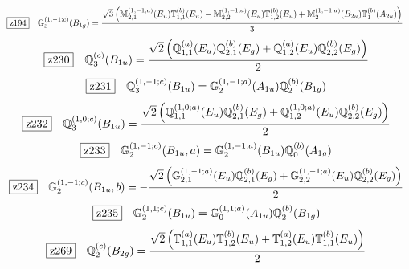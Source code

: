 \documentclass[fleqn,10pt,landscape]{jsarticle}
\begin{document}
\begin{dmath*}
\hspace*{3mm}\fbox{z194}\quad \mathbb{G}_{3}^{(1,-1;c)}(B_{1g})=\frac{\sqrt{3} \left(\mathbb{M}_{2,1}^{(1,-1;a)}(E_{u}) \mathbb{T}_{1,1}^{(b)}(E_{u}) - \mathbb{M}_{2,2}^{(1,-1;a)}(E_{u}) \mathbb{T}_{1,2}^{(b)}(E_{u}) + \mathbb{M}_{2}^{(1,-1;a)}(B_{2u}) \mathbb{T}_{1}^{(b)}(A_{2u})\right)}{3}
\end{dmath*}
\begin{dmath*}
\hspace*{3mm}\fbox{z230}\quad \mathbb{Q}_{3}^{(c)}(B_{1u})=\frac{\sqrt{2} \left(\mathbb{Q}_{1,1}^{(a)}(E_{u}) \mathbb{Q}_{2,1}^{(b)}(E_{g}) + \mathbb{Q}_{1,2}^{(a)}(E_{u}) \mathbb{Q}_{2,2}^{(b)}(E_{g})\right)}{2}
\end{dmath*}
\begin{dmath*}
\hspace*{3mm}\fbox{z231}\quad \mathbb{Q}_{3}^{(1,-1;c)}(B_{1u})=\mathbb{G}_{2}^{(1,-1;a)}(A_{1u}) \mathbb{Q}_{2}^{(b)}(B_{1g})
\end{dmath*}
\begin{dmath*}
\hspace*{3mm}\fbox{z232}\quad \mathbb{Q}_{3}^{(1,0;c)}(B_{1u})=\frac{\sqrt{2} \left(\mathbb{Q}_{1,1}^{(1,0;a)}(E_{u}) \mathbb{Q}_{2,1}^{(b)}(E_{g}) + \mathbb{Q}_{1,2}^{(1,0;a)}(E_{u}) \mathbb{Q}_{2,2}^{(b)}(E_{g})\right)}{2}
\end{dmath*}
\begin{dmath*}
\hspace*{3mm}\fbox{z233}\quad \mathbb{G}_{2}^{(1,-1;c)}(B_{1u},a)=\mathbb{G}_{2}^{(1,-1;a)}(B_{1u}) \mathbb{Q}_{0}^{(b)}(A_{1g})
\end{dmath*}
\begin{dmath*}
\hspace*{3mm}\fbox{z234}\quad \mathbb{G}_{2}^{(1,-1;c)}(B_{1u},b)=- \frac{\sqrt{2} \left(\mathbb{G}_{2,1}^{(1,-1;a)}(E_{u}) \mathbb{Q}_{2,1}^{(b)}(E_{g}) + \mathbb{G}_{2,2}^{(1,-1;a)}(E_{u}) \mathbb{Q}_{2,2}^{(b)}(E_{g})\right)}{2}
\end{dmath*}
\begin{dmath*}
\hspace*{3mm}\fbox{z235}\quad \mathbb{G}_{2}^{(1,1;c)}(B_{1u})=\mathbb{G}_{0}^{(1,1;a)}(A_{1u}) \mathbb{Q}_{2}^{(b)}(B_{1g})
\end{dmath*}
\begin{dmath*}
\hspace*{3mm}\fbox{z269}\quad \mathbb{Q}_{2}^{(c)}(B_{2g})=\frac{\sqrt{2} \left(\mathbb{T}_{1,1}^{(a)}(E_{u}) \mathbb{T}_{1,2}^{(b)}(E_{u}) + \mathbb{T}_{1,2}^{(a)}(E_{u}) \mathbb{T}_{1,1}^{(b)}(E_{u})\right)}{2}
\end{dmath*}
\end{document}
